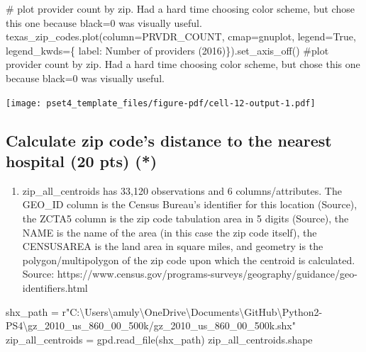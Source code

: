 \documentclass[
  letterpaper,
  DIV=11,
  numbers=noendperiod]{scrartcl}
\newenvironment{Shaded}{\begin{snugshade}}{\end{snugshade}}
\newcommand{\CommentTok}[1]{\textcolor[rgb]{0.37,0.37,0.37}{#1}}
\newcommand{\NormalTok}[1]{\textcolor[rgb]{0.00,0.23,0.31}{#1}}
\newcommand{\OperatorTok}[1]{\textcolor[rgb]{0.37,0.37,0.37}{#1}}
\newcommand{\StringTok}[1]{\textcolor[rgb]{0.13,0.47,0.30}{#1}}
\newcommand{\VariableTok}[1]{\textcolor[rgb]{0.07,0.07,0.07}{#1}}
\newcommand{\VerbatimStringTok}[1]{\textcolor[rgb]{0.13,0.47,0.30}{#1}}
\providecommand{\tightlist}{%
  \setlength{\itemsep}{0pt}\setlength{\parskip}{0pt}}\usepackage{longtable,booktabs,array}
\begin{document}
\begin{Shaded}
\begin{Highlighting}[]
\CommentTok{\# plot provider count by zip. Had a hard time choosing color scheme, but chose this one because black=0 was visually useful.}
\NormalTok{texas\_zip\_codes.plot(column}\OperatorTok{=}\StringTok{\textquotesingle{}PRVDR\_COUNT\textquotesingle{}}\NormalTok{, cmap}\OperatorTok{=}\StringTok{\textquotesingle{}gnuplot\textquotesingle{}}\NormalTok{, legend}\OperatorTok{=}\VariableTok{True}\NormalTok{, legend\_kwds}\OperatorTok{=}\NormalTok{\{}
                     \StringTok{\textquotesingle{}label\textquotesingle{}}\NormalTok{: }\StringTok{\textquotesingle{}Number of providers (2016)\textquotesingle{}}\NormalTok{\}).set\_axis\_off() }\CommentTok{\#plot provider count by zip. Had a hard time choosing color scheme, but chose this one because black=0 was visually useful.}
\end{Highlighting}
\end{Shaded}

\texttt{[image: pset4\_template\_files/figure-pdf/cell-12-output-1.pdf]}

\subsection{Calculate zip code's distance to the nearest hospital (20
pts)
(*)}\label{calculate-zip-codes-distance-to-the-nearest-hospital-20-pts}

\begin{enumerate}
\def\labelenumi{\arabic{enumi}.}
\tightlist
\item
  zip\_all\_centroids has 33,120 observations and 6 columns/attributes.
  The GEO\_ID column is the Census Bureau's identifier for this location
  (Source), the ZCTA5 column is the zip code tabulation area in 5 digits
  (Source), the NAME is the name of the area (in this case the zip code
  itself), the CENSUSAREA is the land area in square miles, and geometry
  is the polygon/multipolygon of the zip code upon which the centroid is
  calculated. Source:
  https://www.census.gov/programs-surveys/geography/guidance/geo-identifiers.html
\end{enumerate}

\begin{Shaded}
\begin{Highlighting}[]
\NormalTok{shx\_path }\OperatorTok{=} \VerbatimStringTok{r"C:\textbackslash{}Users\textbackslash{}amuly\textbackslash{}OneDrive\textbackslash{}Documents\textbackslash{}GitHub\textbackslash{}Python2{-}PS4\textbackslash{}gz\_2010\_us\_860\_00\_500k/gz\_2010\_us\_860\_00\_500k.shx"}
\NormalTok{zip\_all\_centroids }\OperatorTok{=}\NormalTok{ gpd.read\_file(shx\_path) }
\NormalTok{zip\_all\_centroids.shape}
\end{Highlighting}
\end{Shaded}
\end{document}
